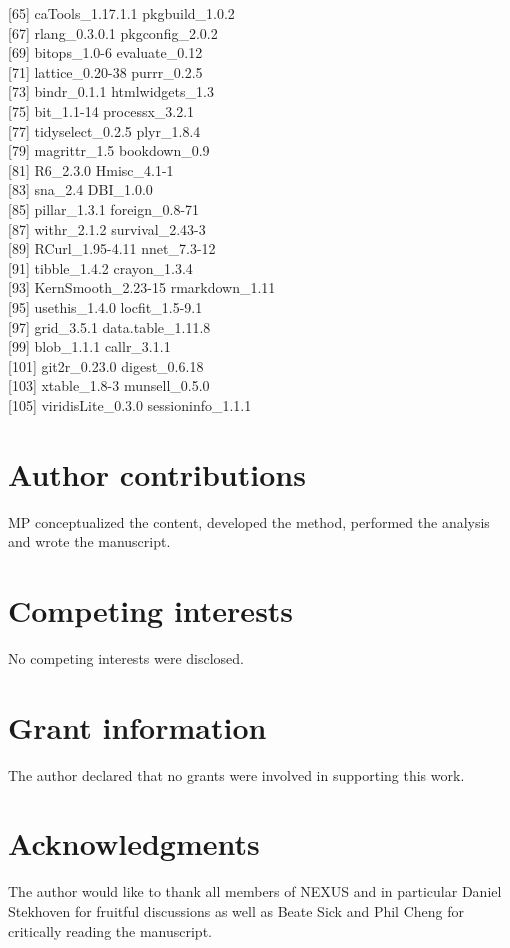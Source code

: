 \documentclass[9pt,a4paper,]{extarticle}
\begin{document}
{[}65{]} caTools\_1.17.1.1 pkgbuild\_1.0.2\\
{[}67{]} rlang\_0.3.0.1 pkgconfig\_2.0.2\\
{[}69{]} bitops\_1.0-6 evaluate\_0.12\\
{[}71{]} lattice\_0.20-38 purrr\_0.2.5\\
{[}73{]} bindr\_0.1.1 htmlwidgets\_1.3\\
{[}75{]} bit\_1.1-14 processx\_3.2.1\\
{[}77{]} tidyselect\_0.2.5 plyr\_1.8.4\\
{[}79{]} magrittr\_1.5 bookdown\_0.9\\
{[}81{]} R6\_2.3.0 Hmisc\_4.1-1\\
{[}83{]} sna\_2.4 DBI\_1.0.0\\
{[}85{]} pillar\_1.3.1 foreign\_0.8-71\\
{[}87{]} withr\_2.1.2 survival\_2.43-3\\
{[}89{]} RCurl\_1.95-4.11 nnet\_7.3-12\\
{[}91{]} tibble\_1.4.2 crayon\_1.3.4\\
{[}93{]} KernSmooth\_2.23-15 rmarkdown\_1.11\\
{[}95{]} usethis\_1.4.0 locfit\_1.5-9.1\\
{[}97{]} grid\_3.5.1 data.table\_1.11.8\\
{[}99{]} blob\_1.1.1 callr\_3.1.1\\
{[}101{]} git2r\_0.23.0 digest\_0.6.18\\
{[}103{]} xtable\_1.8-3 munsell\_0.5.0\\
{[}105{]} viridisLite\_0.3.0 sessioninfo\_1.1.1

\section{Author contributions}\label{author-contributions}

MP conceptualized the content, developed the method, performed the analysis and wrote the manuscript.

\section{Competing interests}\label{competing-interests}

No competing interests were disclosed.

\section{Grant information}\label{grant-information}

The author declared that no grants were involved in supporting this work.

\section{Acknowledgments}\label{acknowledgments}

The author would like to thank all members of NEXUS and in particular Daniel Stekhoven for fruitful discussions as well as Beate Sick and Phil Cheng for critically reading the manuscript.

{\small}
\end{document}
